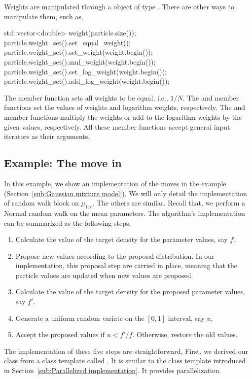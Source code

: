 Weights are manipulated through a object of type . There are other ways to manipulate them, such as,
\begin{cppcode}
std::vector<double> weight(particle.size());
particle.weight_set().set_equal_weight();
particle.weight_set().set_weight(weight.begin());
particle.weight_set().mul_weight(weight.begin());
particle.weight_set().set_log_weight(weight.begin());
particle.weight_set().add_log_weight(weight.begin());
\end{cppcode}
The  member function sets all weights to be equal, i.e., $1/N$. The  and  member functions set the values of weights and logarithm weights, respectively. The  and  member functions multiply the weights or add to the logarithm weights by the given values, respectively. All these member functions accept general input iterators as their arguments.

\subsection{Example: The \protect\mcmc move in \protect\gmm}
\label{sub:Example: The mcmc move in gmm}

In this example, we show an implementation of the \mcmc moves in the \gmm example (Section~\ref{sub:Gaussian mixture model}). We will only detail the implementation of random walk block on $\mu_{1:r}$. The others are similar. Recall that, we perform a Normal random walk on the mean parameters. The \mcmc algorithm's implementation can be summarized as the following steps,
\begin{enumerate}
  \item Calculate the value of the target density for the parameter values, say $f$.
  \item Propose new values according to the proposal distribution. In our implementation, this proposal step are carried in place, meaning that the particle values are updated when new values are proposed.
  \item Calculate the value of the target density for the proposed parameter values, say $f'$.
  \item Generate a uniform random variate on the $[0,1]$ interval, say $u$,
  \item Accept the proposed values if $u < f'/f$. Otherwise, restore the old values.
\end{enumerate}
The implementation of these five steps are straightforward,
First, we derived our class from a class template called . It is similar to the  class template introduced in Section~\ref{sub:Parallelized implementation}. It provides \openmp parallelization.

